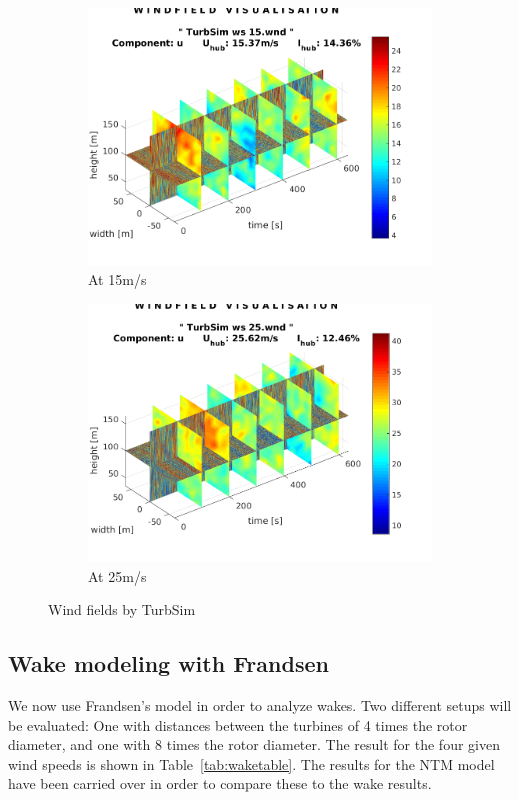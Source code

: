 \documentclass[10pt]{article}
\begin{document}
\begin{figure}[htb!]
\begin{subfigure}{0.4\textwidth}
  \includegraphics[width=1\linewidth]{../CIP_5/CIP_Tutorial_5_-_Windfield_and_wake_simulation/TurbSim/wind_15ms.png}
   \caption{At 15m/s}
\end{subfigure}
\begin{subfigure}{0.4\textwidth}
  \centering
  \includegraphics[width=1\linewidth]{../CIP_5/CIP_Tutorial_5_-_Windfield_and_wake_simulation/TurbSim/wind_25ms.png}
   \caption{At 25m/s}
\end{subfigure}
\caption{Wind fields by TurbSim}
\label{fig:windfields}
\end{figure}


\subsection{Wake modeling with Frandsen}
We now use Frandsen's model in order to analyze wakes. Two different setups will be evaluated: One with distances between the turbines of 4 times the rotor diameter, and one with 8 times the rotor diameter.
The result for the four given wind speeds is shown in Table~\ref{tab:waketable}. The results for the NTM model have been carried over in order to compare these to the wake results.
    
\end{document}
